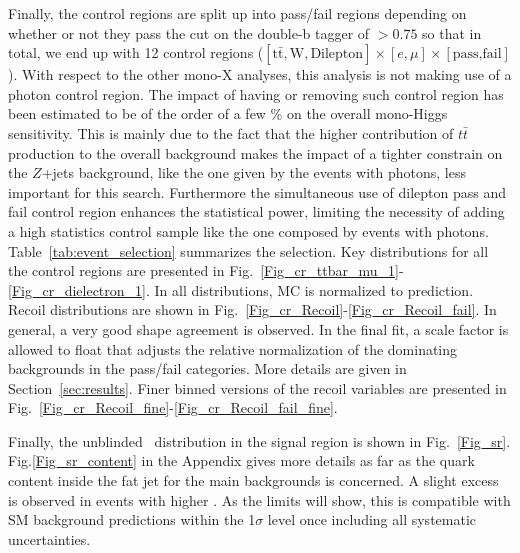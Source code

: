 Finally, the control regions are split up into pass/fail regions depending on whether or not they pass the cut on the double-b tagger of $>0.75$ so that in total, we end up with 12 control regions ($[\text{t}\bar{\text{t}},\text{W},\text{Dilepton}]\times[e,\mu]\times[\text{pass,fail}]$). With respect to the other mono-X analyses, this analysis is not making use of a photon control region. The impact of having or removing such control region has been estimated to be of the order of a few \% on the overall mono-Higgs sensitivity. This is mainly due to the fact that the higher contribution of $t\bar{t}$ production to the overall background makes the impact of a tighter constrain on the $Z$+jets background, like the one given by the events with photons, less important for this search. Furthermore the simultaneous use of dilepton pass and fail control region enhances the statistical power, limiting the necessity of adding a high statistics control sample like the one composed by events with photons. Table~\ref{tab:event_selection} summarizes the selection. Key distributions for all the control regions are presented in Fig.~\ref{Fig_cr_ttbar_mu_1}-\ref{Fig_cr_dielectron_1}. In all distributions, MC is normalized to prediction. Recoil distributions are shown in Fig.~\ref{Fig_cr_Recoil}-\ref{Fig_cr_Recoil_fail}. In general, a very good shape agreement is observed. In the final fit, a scale factor is allowed to float that adjusts the relative normalization of the dominating backgrounds in the pass/fail categories. More details are given in Section~\ref{sec:results}. Finer binned versions of the recoil variables are presented in Fig.~\ref{Fig_cr_Recoil_fine}-\ref{Fig_cr_Recoil_fail_fine}.

Finally, the unblinded \ptmiss~distribution in the signal region is shown in Fig.~\ref{Fig_sr}. Fig.\ref{Fig_sr_content} in the Appendix gives more details as far as the quark content inside the fat jet for the main backgrounds is concerned. A slight excess is observed in events with higher \ptmiss. As the limits will show, this is compatible with SM background predictions within the 1$\sigma$ level once including all systematic uncertainties.

\clearpage

